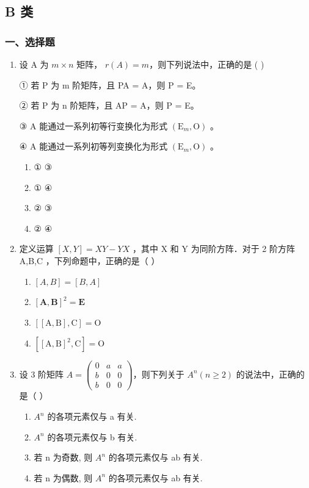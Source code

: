 \documentclass[12pt, a4paper]{ctexart}
\begin{document}
\subsection{B 类}

\subsubsection*{一、选择题}

\begin{enumerate}
    \item 设 A 为 $ m \times n $ 矩阵， $ r(A) = m $，则下列说法中，正确的是 ( \underline{\hspace{1cm}} )
    
    ① 若 P 为 m 阶矩阵，且 PA = A，则 P = E。
    
    ② 若 P 为 n 阶矩阵，且 AP = A，则 P = E。
    
    ③ A 能通过一系列初等行变换化为形式 $ \left(\mathrm{E}_{m},\mathrm{O}\right) $ 。
    
    ④ A 能通过一系列初等列变换化为形式 $ \left(\mathrm{E}_{m},\mathrm{O}\right) $ 。
    \begin{enumerate}[label=(\Alph*)]
        \item ① ③
        \item ① ④
        \item ② ③
        \item ② ④
    \end{enumerate}

    \item 定义运算 $ [X,Y]=XY-YX $ ，其中 X 和 Y 为同阶方阵．对于 2 阶方阵 A,B,C ，下列命题中，正确的是（ \underline{\hspace{1cm}} ）
    \begin{enumerate}[label=(\Alph*)]
        \item $ [A,B]=[B,A] $
        \item $ \left[\mathbf{A},\mathbf{B}\right]^{2}=\mathbf{E} $
        \item $ \left[\left[\mathrm{A},\mathrm{B}\right],\mathrm{C}\right]=\mathrm{O} $
        \item $ \left[\left[\mathrm{A},\mathrm{B}\right]^{2},\mathrm{C}\right]=\mathrm{O} $
    \end{enumerate}

    \item 设 3 阶矩阵 $ A = \begin{pmatrix} 0 & a & a \\ b & 0 & 0 \\ b & 0 & 0 \end{pmatrix} $，则下列关于 $ A^{n}(n \geq 2) $ 的说法中，正确的是（ \underline{\hspace{1cm}} ）
    \begin{enumerate}[label=(\Alph*)]
        \item $ A^{n} $ 的各项元素仅与 a 有关.
        \item $ A^{n} $ 的各项元素仅与 b 有关.
        \item 若 n 为奇数, 则 $ A^{n} $ 的各项元素仅与 ab 有关.
        \item 若 n 为偶数, 则 $ A^{n} $ 的各项元素仅与 ab 有关.
    \end{enumerate}


\end{enumerate}
\end{document}
